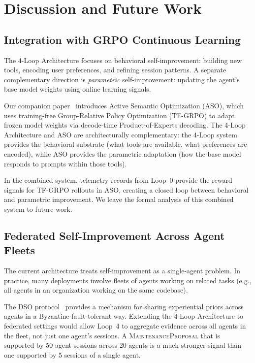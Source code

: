 \section{Discussion and Future Work}

\label{sec:discussion}

\subsection{Integration with GRPO Continuous Learning}

The 4-Loop Architecture focuses on behavioral self-improvement: building new
tools, encoding user preferences, and refining session patterns. A separate
complementary direction is \emph{parametric} self-improvement: updating
the agent's base model weights using online learning signals.

Our companion paper~\cite{hanzo2026aso} introduces Active Semantic Optimization
(ASO), which uses training-free Group-Relative Policy Optimization (TF-GRPO)
to adapt frozen model weights via decode-time Product-of-Experts decoding.
The 4-Loop Architecture and ASO are architecturally complementary: the
4-Loop system provides the behavioral substrate (what tools are available,
what preferences are encoded), while ASO provides the parametric adaptation
(how the base model responds to prompts within those tools).

In the combined system, telemetry records from Loop~0 provide the reward
signals for TF-GRPO rollouts in ASO, creating a closed loop between behavioral
and parametric improvement. We leave the formal analysis of this combined
system to future work.

\subsection{Federated Self-Improvement Across Agent Fleets}

The current architecture treats self-improvement as a single-agent problem.
In practice, many deployments involve fleets of agents working on related
tasks (e.g., all agents in an organization working on the same codebase).

The DSO protocol~\cite{hanzo2026dso} provides a mechanism for sharing
experiential priors across agents in a Byzantine-fault-tolerant way. Extending
the 4-Loop Architecture to federated settings would allow Loop~4 to aggregate
evidence across all agents in the fleet, not just one agent's sessions. A
\textsc{MaintenanceProposal} that is supported by 50 agent-sessions across
20 agents is a much stronger signal than one supported by 5 sessions of a
single agent.


